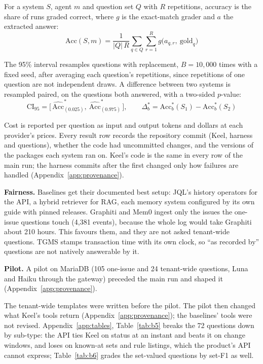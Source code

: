 \documentclass{article}
\begin{document}
For a system $S$, agent $m$ and question set $Q$ with $R$ repetitions, accuracy is the share of runs graded correct, where $g$ is the exact-match grader and $a$ the extracted answer:
\begin{equation*}
\mathrm{Acc}(S, m) = \frac{1}{|Q|\,R} \sum_{q \in Q} \sum_{r=1}^{R} g\big(a_{q,r},\ \mathrm{gold}_q\big)
\end{equation*}

The 95\% interval resamples questions with replacement, $B = 10{,}000$ times with a fixed seed, after averaging each question's repetitions, since repetitions of one question are not independent draws. A difference between two systems is resampled paired, on the questions both answered, with a two-sided $p$-value:
\begin{equation*}
\mathrm{CI}_{95} = \big[\,\widehat{\mathrm{Acc}}^{*}_{(0.025)},\ \widehat{\mathrm{Acc}}^{*}_{(0.975)}\,\big], \qquad \Delta^{*}_b = \mathrm{Acc}^{*}_b(S_1) - \mathrm{Acc}^{*}_b(S_2)
\end{equation*}

Cost is reported per question as input and output tokens and dollars at each provider's prices. Every result row records the repository commit (Keel, harness and questions), whether the code had uncommitted changes, and the versions of the packages each system ran on. Keel's code is the same in every row of the main run; the harness commits after the first changed only how failures are handled (Appendix~\ref{app:provenance}).

\textbf{Fairness.} Baselines get their documented best setup: JQL's history operators for the API, a hybrid retriever for RAG, each memory system configured by its own guide with pinned releases. Graphiti and Mem0 ingest only the issues the one-issue questions touch (4,381 events), because the whole log would take Graphiti about 210 hours. This favours them, and they are not asked tenant-wide questions. TGMS stamps transaction time with its own clock, so ``as recorded by'' questions are not natively answerable by it.

\textbf{Pilot.} A pilot on MariaDB (105 one-issue and 24 tenant-wide questions, Luna and Haiku through the gateway) preceded the main run and shaped it (Appendix~\ref{app:provenance}).

The tenant-wide templates were written before the pilot. The pilot then changed what Keel's tools return (Appendix~\ref{app:provenance}); the baselines' tools were not revised. Appendix~\ref{app:tables}, Table~\ref{tab:b5} breaks the 72 questions down by sub-type: the API ties Keel on status at an instant and beats it on change windows, and loses on known-at sets and rule listings, which the product's API cannot express; Table~\ref{tab:b6} grades the set-valued questions by set-F1 as well.
\end{document}

